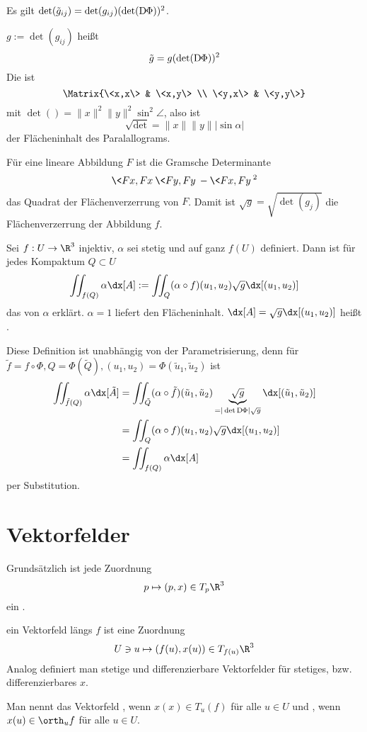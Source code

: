 Es gilt $\det(\tilde g_{ij}) = \det(g_{ij}) (\det(\Df[\Phi]))^2$.

$g := \det(g_{ij})$ heißt 
\[
	\tilde g = g (\det(\Df[\Phi]))^2
\]
Die  ist
\[
	\Matrix{\<x,x\> & \<x,y\> \\ \<y,x\> & \<y,y\>}
\]
mit $\det() = \|x\|^2 \|y\|^2 \sin^2 \angle$, also ist
\[
	\sqrt{\det}
	= \|x\|\|y\| |\sin \alpha|
\]
der Flächeninhalt des Paralallograms.

Für eine lineare Abbildung $F$ ist die Gramsche Determinante
\[
	\<Fx, Fx\> \<Fy, Fy\> - \<Fx, Fy\>^2
\]
das Quadrat der Flächenverzerrung von $F$.
Damit ist $\sqrt{g} = \sqrt{\det(g_{j})}$ die Flächenverzerrung der Abbildung $f$.

\begin{df}[Oberflächenintegral]
	Sei $f: U \to \R^3$ injektiv, $\alpha$ sei stetig und auf ganz $f(U)$ definiert.
	Dann ist für jedes Kompaktum $Q \subset U$
	\[
		\iint_{f(Q)} \alpha \dx[A]
		:= \iint_{Q} (\alpha \circ f)(u_1, u_2) \sqrt{g} \dx[(u_1, u_2)]
	\]
	das  von $\alpha$ erklärt.
	$\alpha = 1$ liefert den Flächeninhalt.
	$\dx[A] = \sqrt{g} \dx[(u_1, u_2)]$ heißt .
	\begin{note}
		Diese Definition ist unabhängig von der Parametrisierung, denn für $\tilde f = f \circ \Phi, Q = \Phi(\tilde Q), (u_1,u_2) = \Phi(\tilde u_1, \tilde u_2)$ ist
		\begin{align*}
			\iint_{\tilde f(Q)} \alpha \dx[\tilde A]
			&= \iint_{\tilde Q} (\alpha \circ \tilde f)(\tilde u_1, \tilde u_2) \underbrace{\sqrt{g}}_{=|\det \Df[\Phi]| \sqrt{g}} \dx[(\tilde u_1, \tilde u_2)] \\
			&= \iint_{Q} (\alpha \circ f) (u_1, u_2) \sqrt{g} \dx[(u_1, u_2)] \\
			&= \iint_{f(Q)} \alpha \dx[A]
		\end{align*}
		per Substitution.
	\end{note}
\end{df}

\section{Vektorfelder}


Grundsätzlich ist jede Zuordnung
\[
	p \mapsto (p, x) \in T_p\R^3
\]
ein .

\begin{df}
	ein Vektorfeld längs $f$ ist eine Zuordnung
	\[
		U \ni u \mapsto (f(u), x(u)) \in T_{f(u)} \R^3
	\]
	Analog definiert man stetige und differenzierbare Vektorfelder für stetiges, bzw. differenzierbares $x$.

	Man nennt das Vektorfeld , wenn $x(x) \in T_u(f)$ für alle $u \in U$ und , wenn $x(u) \in \orth_u f$ für alle $u \in U$.
\end{df}

